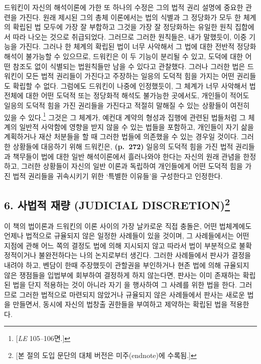 드워킨이 자신의 해석이론에 가한 또 하나의 수정은 그의 법적 권리 설명에
중요한 관련을 가진다. 원래 제시된 그의 총체 이론에서는 법의 식별과 그
정당화가 모두 한 체계의 확립된 법 모두에 가장 잘 부합하고 그것을 가장 잘
정당화하는 유일한 원칙 집합에서 따라 나오는 것으로 취급되었다. 그러므로
그러한 원칙들은, 내가 말했듯이, 이중 기능을 가진다. 그러나 한 체계의
확립된 법이 너무 사악해서 그 법에 대한 전반적 정당화 해석이 불가능할 수
있으므로, 드워킨은 이 두 기능이 분리될 수 있고, 도덕에 대한 어떤 참조도
없이 식별되는 법원칙들만 남을 수 있다고 관찰했다. 그러나 그러한 법은
드워킨이 모든 법적 권리들이 가진다고 주장하는 일응의 도덕적 힘을 가지는
어떤 권리들도 확립할 수 없다. 그럼에도 드워킨이 나중에 인정했듯이, 그
체계가 너무 사악해서 법 전체에 대한 어떤 도덕적 또는 정당화적 해석도
불가능한 곳에서도, 개인들이 적어도 일응의 도덕적 힘을 가진 권리들을
가진다고 적절히 말해질 수 있는 상황들이 여전히 있을 수 있다.\footnote{{[}\emph{LE}
  105--106면.{]}} 그것은 그 체계가, 예컨대 계약의 형성과 집행에 관련된
법들처럼 그 체계의 일반적 사악함에 영향을 받지 않을 수 있는 법들을
포함하고, 개인들이 자기 삶을 계획하거나 재산 처분들을 할 때 그러한
법들에 의존했을 수 있는 경우일 것이다. 그러한 상황들에 대응하기 위해
드워킨은, \textbf{(p.~272)} 일응의 도덕적 힘을 가진 법적 권리들과
책무들이 법에 대한 일반 해석이론에서 흘러나와야 한다는 자신의 원래
관념을 한정하고, 그러한 상황들이 자신의 일반 이론과 독립하여 개인들에게
어떤 도덕적 힘을 가진 법적 권리들을 귀속시키기 위한 ‘특별한 이유들’을
구성한다고 인정한다.

\subsection[6. 사법적 재량 (JUDICIAL DISCRETION)]{\texorpdfstring{6.
사법적 재량 (JUDICIAL
DISCRETION)\footnote{{[}본 절의 도입 문단의 대체 버전은 미주(endnote)에
  수록됨.{]}}}{6. 사법적 재량 (JUDICIAL DISCRETION)}}\label{uxc0acuxbc95uxc801-uxc7acuxb7c9-judicial-discretion73}

이 책의 법이론과 드워킨의 이론 사이의 가장 날카로운 직접 충돌은, 어떤
법체계에도 언제나 법적으로 규율되지 않은 일정한 사례들이 있을 것이며, 그
사례들에서는 어떤 지점에 관해 어느 쪽의 결정도 법에 의해 지시되지 않고
따라서 법이 부분적으로 불확정적이거나 불완전하다는 나의 논지로부터
생긴다. 그러한 사례들에서 판사가 결정을 내려야 하고, 벤담이 한때
주장했듯이 관할권을 부인하거나 현존 법에 의해 규율되지 않은 쟁점들을
입법부에 회부하여 결정하게 하지 않는다면, 판사는 이미 존재하는 확립된
법을 단지 적용하는 것이 아니라 자기 을 행사하여 그 사례를
위한 법을  한다. 그러므로 그러한 법적으로 마련되지
않았거나 규율되지 않은 사례들에서 판사는 새로운 법을 만들면서, 동시에
자신의 법창출 권한들을 부여하고 제약하는 확립된 법을 적용한다.

